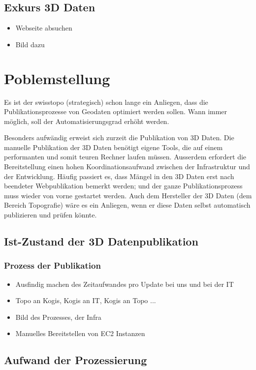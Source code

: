 \subsection{Exkurs 3D Daten}
\begin{itemize}
\item Webseite absuchen
\item Bild dazu
\end{itemize}

\section{Poblemstellung}

Es ist der swisstopo (strategisch) schon lange ein Anliegen, dass die Publikationsprozesse von Geodaten optimiert werden
sollen. Wann immer möglich, soll der Automatisierungsgrad erhöht werden.

Besonders aufwändig erweist sich zurzeit die Publikation von 3D Daten. Die manuelle Publikation
der 3D Daten benötigt eigene Tools, die auf einem performanten und somit teuren Rechner laufen
müssen. Ausserdem erfordert die Bereitstellung einen hohen Koordinationsaufwand zwischen der
Infrastruktur und der Entwicklung. Häufig passiert es, dass Mängel in den 3D Daten erst nach
beendeter Webpublikation bemerkt werden; und der ganze Publikationsprozess muss wieder von
vorne gestartet werden.
Auch dem Hersteller der 3D Daten (dem Bereich Topografie) wäre es ein Anliegen, wenn er diese
Daten selbst automatisch publizieren und prüfen könnte.

\subsection{Ist-Zustand der 3D Datenpublikation}
\subsubsection{Prozess der Publikation}
\begin{itemize}
\item Ausfindig machen des Zeitaufwandes pro Update bei uns und bei der IT
\item Topo an Kogis, Kogis an IT, Kogis an Topo ... 
\item Bild des Prozesses, der Infra
\item Manuelles Bereitstellen von EC2 Instanzen
\end{itemize}

\subsection{Aufwand der Prozessierung}